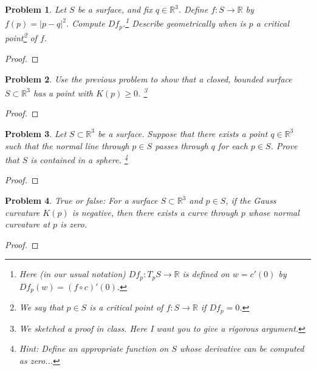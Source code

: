 \documentclass[11pt]{article}
\newtheorem{problem}{Problem}
\begin{document}
\pagebreak

\begin{problem}
Let $S$ be a surface, and fix $q\in\mathbb R^3$. Define $f:S\to\mathbb R$ by $f(p)=|p-q|^2$. Compute $Df_p$.\footnote{Here (in our usual notation) $Df_p:T_pS\to\mathbb R$ is defined on $w=c'(0)$ by $Df_p(w)=(f\circ c)'(0)$.} Describe geometrically when is $p$ a critical point\footnote{We say that $p\in S$ is a critical point of $f:S\to\mathbb R$ if $Df_p=0$.}  of $f$.
\end{problem}

\begin{proof}

\end{proof}

\pagebreak

\begin{problem}
Use the previous problem to show that a closed, bounded surface $S\subset\mathbb R^3$ has a point with $K(p)\ge0$. \footnote{We sketched a proof in class. Here I want you to give a rigorous argument.} 
\end{problem}

\begin{proof}

\end{proof}

\pagebreak


\begin{problem}
Let $S\subset\mathbb R^3$ be a surface. Suppose that there exists a point $q\in\mathbb R^3$ such that the normal line through $p\in S$ passes through $q$ for each $p\in S$. Prove that $S$ is contained in a sphere. \footnote{Hint: Define an appropriate function on $S$ whose derivative can be computed as zero...}
\end{problem}

\begin{proof}

\end{proof}

\pagebreak

\begin{problem}
True or false: For a surface $S\subset\mathbb R^3$ and $p\in S$, if the Gauss curvature $K(p)$ is negative, then there exists a curve through $p$ whose normal curvature at $p$ is zero. 
\end{problem}

\begin{proof}

\end{proof}
\end{document}
